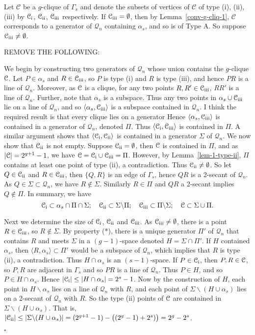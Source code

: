 \documentclass[12pt]{article}
\newenvironment{proof}{\noindent{\bf Proof}\hspace{0.5em}}
    { \null  \hfill $\square$ \par}
\newcommand\C{{\cal C}}
\newcommand{\Q}{\mathscr Q}
\renewcommand\setminus{\backslash}
\newcommand\TODO[1]{{\color{Purple} #1}}
\newcommand\blue[1]{{\color{blue} #1}}
\newcommand{\clique}{\mathcal C}
\newcommand{\setX}{{\mathcal C}_{{\rm\romannumeral 1}}}
\newcommand{\setY}{{\mathcal C}_{{\rm\romannumeral 2}}}
\newcommand{\setZ}{{\mathcal C}_{{\rm\romannumeral 3}}}
\begin{document}
\begin{proof}
Let $\clique$ be a $g$-clique of $\Gamma_s$ and denote the subsets of vertices of $\clique$ of type (i), (ii), (iii) by $\setX$, $\setY$, $\setZ$ respectively. 
If $\setZ=\emptyset$, then by Lemma~\ref{conv-g-cliq-1},
$\clique$ corresponds to a generator of $\Q_n$ containing $\alpha_s$, and so  is of Type A. So suppose $\setZ\neq \emptyset$. 


\blue{REMOVE THE FOLLOWING: 

We begin by  constructing two generators of $\Q_n$ whose union contains the $g$-clique $\C$. 
Let $P\in\alpha_s$ and $R\in\setZ$, so $P$ is type (i) and $R$ is type (iii), and hence  $PR$ is a line of $\Q_n$.  Moreover, as $\C$ is a clique,  for any two points $R,R'\in\setZ$, $RR'$ is a line of $\Q_n$.  Further, note that $\alpha_s$ is a subspace. Thus any  two points in $\alpha_s\cup\setZ$ lie on a line of $\Q_n$, and so $\langle\alpha_s,\setZ\rangle$ is a subspace contained in $\Q_n$. \TODO{I think the required result is that every clique lies on a generator} Hence $\langle\alpha_s,\setZ\rangle$  is contained in a generator  of $\Q_n$, denoted $\Pi$. Thus  $\langle\setX,\setZ\rangle$ is contained in $\Pi$.
A similar argument  shows that $\langle\setX,\setY\rangle$ is contained in a generator $\Sigma$ of $\Q_n$. 
We now show that $\setY$ is not empty. Suppose $\setY=\emptyset$, then 
$\C$ is contained in $\Pi$, and as $|\C|=2^{g+1}-1$, 
we have  $\C=\setX\cup\setZ=\Pi$.  However, by Lemma~\ref{lem-1-type-ii}, $\Pi$ contains at least one point of type (ii), a contradiction.  Thus $\setY\ne\emptyset$.
So let $Q\in\setY$ and $R\in\setZ$, then $\{Q,R\}$ is an edge of $\Gamma_s$, hence $QR$ is a 2-secant of $\Q_n$. As $Q\in\Sigma\subset\Q_n$, we have $R\notin\Sigma$. Similarly $R\in\Pi$ and $QR$ a 2-secant implies $Q\notin\Pi$. 
 In summary,  we have 
 $$\setX\subset\alpha_s\cap\Pi\cap\Sigma;\quad \setY\subset \Sigma\setminus\Pi; \quad \setZ\subset\Pi\setminus\Sigma;\quad  
  \C\subset\Sigma \cup \Pi.$$


  
Next we determine the size of $\setX$, $\setY$ and $\setZ$. 
As $\setZ\neq\emptyset$, there is a point $R\in\setZ$, so $R\notin\Sigma$. By property (*),  there is a unique generator $\Pi'$ of $\Q_n$ that contains $R$ and meets $\Sigma$ in a $(g-1)$-space denoted  $H=\Sigma\cap\Pi'$. 
If $H$ contained $\alpha_s$, then $\langle R,\alpha_s\rangle\subset\Pi'$ would be a subspace of $\Q_n$, which implies that $R$ is type (ii), a contradiction. Thus $H\cap\alpha_s$ is an $(s-1)$-space. 
If $P\in\setX$, then $P,R\in\C$, so $P,R$ are adjacent in $\Gamma_s$ and so $PR$ is a line of $\Q_n$. Thus $P\in H$, and so $P\in H\cap\alpha_s$. Hence
 $|\setX|\leq |H\cap\alpha_s|=2^s-1$.  Now by the construction of $H$, each point in $H\setminus\alpha_s$ lies on a line of $\Q_n$ with $R$, and each point of $\Sigma\setminus(H\cup\alpha_s)$ lies on a 2-secant of $\Q_n$ with $R$. So the type (ii) points of $\C$ are contained in $ \Sigma\setminus(H\cup\alpha_s)$. That is, $|\setY|\leq|\Sigma\setminus(H\cup\alpha_s)|=(2^{g+1}-1)-\big((2^g-1)+2^s)\big)=2^g-2^s$.
 
}
\end{proof}
\end{document}
